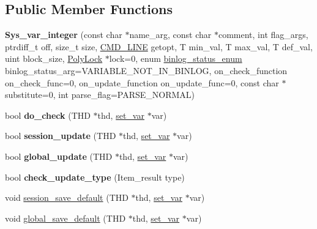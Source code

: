 \subsection*{Public Member Functions}
\begin{DoxyCompactItemize}
\item 
\mbox{\label{classSys__var__integer_a489bb539b6748d4500f8f4dfa24e0531}} 
{\bfseries Sys\+\_\+var\+\_\+integer} (const char $\ast$name\+\_\+arg, const char $\ast$comment, int flag\+\_\+args, ptrdiff\+\_\+t off, size\+\_\+t size, \mbox{\hyperlink{structCMD__LINE}{C\+M\+D\+\_\+\+L\+I\+NE}} getopt, T min\+\_\+val, T max\+\_\+val, T def\+\_\+val, uint block\+\_\+size, \mbox{\hyperlink{classPolyLock}{Poly\+Lock}} $\ast$lock=0, enum \mbox{\hyperlink{classsys__var_a664520ec82191888717c86085bfa83ce}{binlog\+\_\+status\+\_\+enum}} binlog\+\_\+status\+\_\+arg=V\+A\+R\+I\+A\+B\+L\+E\+\_\+\+N\+O\+T\+\_\+\+I\+N\+\_\+\+B\+I\+N\+L\+OG, on\+\_\+check\+\_\+function on\+\_\+check\+\_\+func=0, on\+\_\+update\+\_\+function on\+\_\+update\+\_\+func=0, const char $\ast$substitute=0, int parse\+\_\+flag=P\+A\+R\+S\+E\+\_\+\+N\+O\+R\+M\+AL)
\item 
\mbox{\label{classSys__var__integer_affb84d24fdab340363d9a72c3cb00f7d}} 
bool {\bfseries do\+\_\+check} (T\+HD $\ast$thd, \mbox{\hyperlink{classset__var}{set\+\_\+var}} $\ast$var)
\item 
\mbox{\label{classSys__var__integer_ae485fe4251daf142568c76c80fd968e7}} 
bool {\bfseries session\+\_\+update} (T\+HD $\ast$thd, \mbox{\hyperlink{classset__var}{set\+\_\+var}} $\ast$var)
\item 
\mbox{\label{classSys__var__integer_abd0840e731953d5020af33408462a052}} 
bool {\bfseries global\+\_\+update} (T\+HD $\ast$thd, \mbox{\hyperlink{classset__var}{set\+\_\+var}} $\ast$var)
\item 
\mbox{\label{classSys__var__integer_a4c234eb291bfbda4ce38f7bc2bd3bbd2}} 
bool {\bfseries check\+\_\+update\+\_\+type} (Item\+\_\+result type)
\item 
void \mbox{\hyperlink{classSys__var__integer_aed46d5a98789b087a079ff51f1d6a9a7}{session\+\_\+save\+\_\+default}} (T\+HD $\ast$thd, \mbox{\hyperlink{classset__var}{set\+\_\+var}} $\ast$var)
\item 
void \mbox{\hyperlink{classSys__var__integer_a59952c5211c10659bc16a0f5f5706e9f}{global\+\_\+save\+\_\+default}} (T\+HD $\ast$thd, \mbox{\hyperlink{classset__var}{set\+\_\+var}} $\ast$var)
\end{DoxyCompactItemize}
